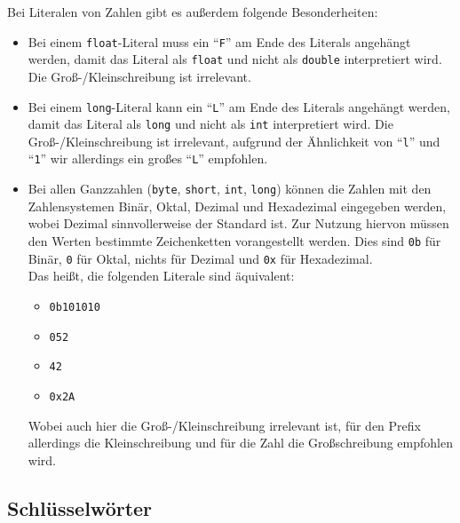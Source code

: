 	Bei Literalen von Zahlen gibt es außerdem folgende Besonderheiten:
	\begin{itemize}
		\item Bei einem \texttt{float}-Literal muss ein \enquote{\texttt{F}} am Ende des Literals angehängt werden, damit das Literal als \texttt{float} und nicht als \texttt{double} interpretiert wird. Die Groß-/Kleinschreibung ist irrelevant.
		\item Bei einem \texttt{long}-Literal kann ein \enquote{\texttt{L}} am Ende des Literals angehängt werden, damit das Literal als \texttt{long} und nicht als \texttt{int} interpretiert wird. Die Groß-/Kleinschreibung ist irrelevant, aufgrund der Ähnlichkeit von \enquote{\texttt{l}} und \enquote{\texttt{1}} wir allerdings ein großes \enquote{\texttt{L}} empfohlen.
		\item Bei allen Ganzzahlen (\texttt{byte}, \texttt{short}, \texttt{int}, \texttt{long}) können die Zahlen mit den Zahlensystemen Binär, Oktal, Dezimal und Hexadezimal eingegeben werden, wobei Dezimal sinnvollerweise der Standard ist. Zur Nutzung hiervon müssen den Werten bestimmte Zeichenketten vorangestellt werden. Dies sind \texttt{0b} für Binär, \texttt{0} für Oktal, nichts für Dezimal und \texttt{0x} für Hexadezimal. \\ Das heißt, die folgenden Literale sind äquivalent:
			\begin{itemize}
				\item \texttt{0b101010}
				\item \texttt{052}
				\item \texttt{42}
				\item \texttt{0x2A}
			\end{itemize}
			Wobei auch hier die Groß-/Kleinschreibung irrelevant ist, für den Prefix allerdings die Kleinschreibung und für die Zahl die Großschreibung empfohlen wird.
	\end{itemize}
	
	
	

\subsection{Schlüsselwörter}
	
